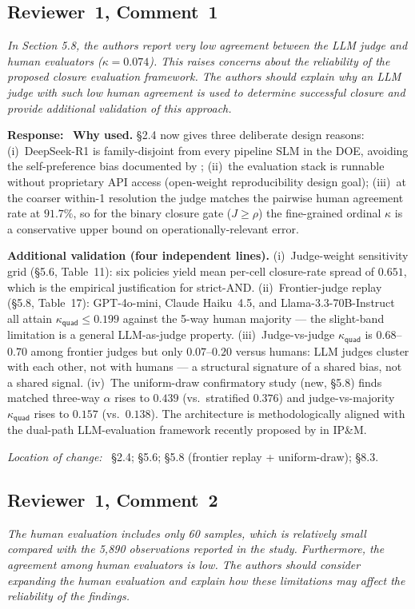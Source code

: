 \documentclass[11pt,a4paper]{article}
\newenvironment{reviewerquote}
  {\begin{tcolorbox}[colback=black!5, colframe=black!15, boxrule=0.3pt,
                     arc=1pt, left=6pt, right=6pt, top=3pt, bottom=3pt,
                     breakable]\itshape\small}
  {\end{tcolorbox}}
\newcommand{\rcomment}[2]{\subsection*{Reviewer~#1, Comment~#2}}
\newcommand{\response}{\noindent\textbf{Response:}\ }
\newcommand{\loc}{\par\smallskip\noindent\textit{Location of change:}\ }
\begin{document}
\rcomment{1}{1}

\begin{reviewerquote}
In Section 5.8, the authors report very low agreement between the LLM judge and human evaluators ($\kappa = 0.074$). This raises concerns about the reliability of the proposed closure evaluation framework. The authors should explain why an LLM judge with such low human agreement is used to determine successful closure and provide additional validation of this approach.
\end{reviewerquote}

\response{}
\textbf{Why used.} \S2.4 now gives three deliberate design reasons: (i)~DeepSeek-R1 is family-disjoint from every pipeline SLM in the DOE, avoiding the self-preference bias documented by \citet{Panickssery2024JudgeBias}; (ii)~the evaluation stack is runnable without proprietary API access (open-weight reproducibility design goal); (iii)~at the coarser within-1 resolution the judge matches the pairwise human agreement rate at $91.7\%$, so for the binary closure gate ($J \geq \rho$) the fine-grained ordinal $\kappa$ is a conservative upper bound on operationally-relevant error.

\textbf{Additional validation (four independent lines).} (i)~Judge-weight sensitivity grid (\S5.6, Table~11): six policies yield mean per-cell closure-rate spread of $0.651$, which is the empirical justification for strict-AND. (ii)~Frontier-judge replay (\S5.8, Table~17): GPT-4o-mini, Claude Haiku~4.5, and Llama-3.3-70B-Instruct all attain $\kappa_{\textsf{quad}} \leq 0.199$ against the 5-way human majority --- the slight-band limitation is a general LLM-as-judge property. (iii)~Judge-vs-judge $\kappa_{\textsf{quad}}$ is $0.68$--$0.70$ among frontier judges but only $0.07$--$0.20$ versus humans: LLM judges cluster with each other, not with humans --- a structural signature of a shared bias, not a shared signal. (iv)~The uniform-draw confirmatory study (new, \S5.8) finds matched three-way $\alpha$ rises to $0.439$ (vs.\ stratified $0.376$) and judge-vs-majority $\kappa_{\textsf{quad}}$ rises to $0.157$ (vs.\ $0.138$). The architecture is methodologically aligned with the dual-path LLM-evaluation framework recently proposed by \citet{Han2026CrisisKnowledge} in IP\&M.

\loc{} \S2.4; \S5.6; \S5.8 (frontier replay + uniform-draw); \S8.3.

\rcomment{1}{2}

\begin{reviewerquote}
The human evaluation includes only 60 samples, which is relatively small compared with the 5,890 observations reported in the study. Furthermore, the agreement among human evaluators is low. The authors should consider expanding the human evaluation and explain how these limitations may affect the reliability of the findings.
\end{reviewerquote}
\end{document}
